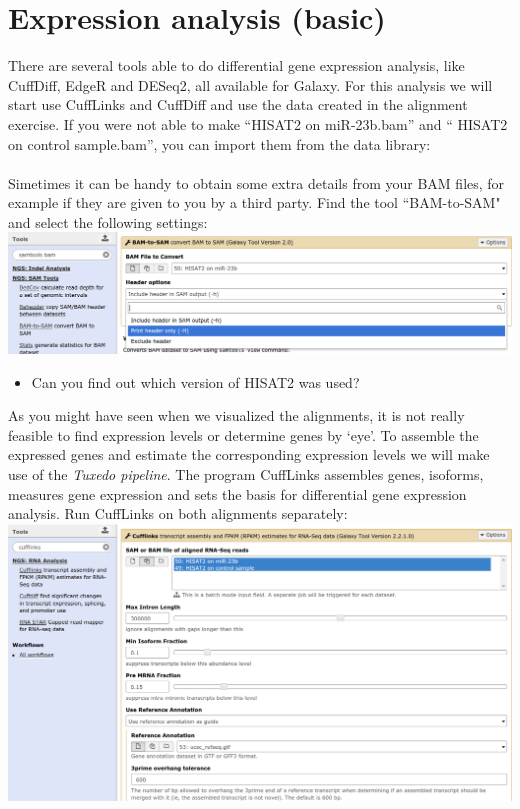 \documentclass[11pt,a4paper]{article}
\begin{document}


\section{Expression analysis (basic)}
There are several tools able to do differential gene expression analysis, like CuffDiff, EdgeR and DESeq2, all available for Galaxy. For this analysis we will start use CuffLinks and CuffDiff and use the data created in the alignment exercise. If you were not able to make ``HISAT2 on miR-23b.bam'' and `` HISAT2 on control sample.bam'', you can import them from the data library:\\
\datalibrarydirrnaseqtuxedo \\
Simetimes it can be handy to obtain some extra details from your BAM files, for example if they are given to you by a third party. Find the tool ``BAM-to-SAM" and select the following settings:\\
\includegraphics[width=\textwidth]{figures/basic_01.png}\\
\begin{itemize}
	\item Can you find out which version of HISAT2 was used?
\end{itemize}
As you might have seen when we visualized the alignments, it is not really feasible to find expression levels or determine genes by `eye'. To assemble the expressed genes and estimate the corresponding expression levels we will make use of the \textit{Tuxedo pipeline}. The program CuffLinks assembles genes, isoforms, measures gene expression and sets the basis for differential gene expression analysis. Run CuffLinks on both alignments separately:\\
\includegraphics[width=\textwidth]{figures/basic_02a.png}\\
\end{document}
